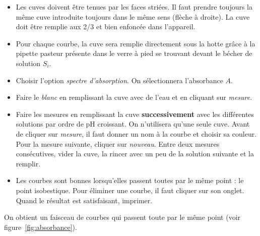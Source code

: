 \documentclass{tp}
\begin{document}
\begin{itemize}
  \item Les cuves doivent être tenues par les faces striées. Il faut prendre toujours la même cuve introduite toujours dans le même sens (flèche à droite). La cuve doit être remplie aux 2/3  et bien enfoncée dans l'appareil.

  \item Pour chaque courbe, la cuve sera remplie directement sous la hotte grâce à la pipette pasteur présente dans le verre à pied se trouvant devant le bécher de solution $S_i$. 

  \item Choisir l'option \emph{spectre d'absorption}. On sélectionnera l'absorbance $A$. 

  \item Faire le \emph{blanc} en remplissant la cuve avec de l'eau et en cliquant sur \emph{mesure}. 

  \item Faire les mesures en remplissant la cuve \textbf{successivement} avec les différentes solutions par ordre de pH croissant. On n'utilisera qu'une seule cuve. Avant de cliquer sur \emph{mesure}, il faut donner un nom à la courbe et choisir sa couleur. Pour la mesure suivante, cliquer sur \emph{nouveau}. Entre deux mesures consécutives, vider la cuve, la rincer avec un peu de la solution suivante et la remplir.

  \item Les courbes sont bonnes lorsqu'elles passent toutes par le même point : le point isobestique. Pour éliminer une courbe, il faut cliquer sur son onglet. Quand le résultat est satisfaisant, imprimer.
\end{itemize}

On obtient un faisceau de courbes qui passent toute par le même point (voir figure~\ref{fig:absorbance}). 
\end{document}

